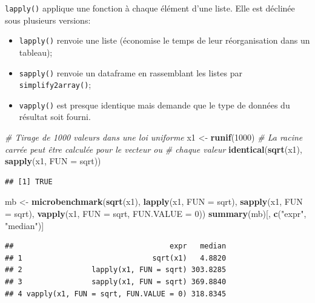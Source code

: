 \documentclass[
  12pt,
  french,
  a4paper,
  extrafontsizes,onecolumn,openright
  ]{memoir}
\newenvironment{Shaded}{\begin{snugshade}}{\end{snugshade}}
\newcommand{\CommentTok}[1]{\textcolor[rgb]{0.56,0.35,0.01}{\textit{#1}}}
\newcommand{\DataTypeTok}[1]{\textcolor[rgb]{0.13,0.29,0.53}{#1}}
\newcommand{\DecValTok}[1]{\textcolor[rgb]{0.00,0.00,0.81}{#1}}
\newcommand{\KeywordTok}[1]{\textcolor[rgb]{0.13,0.29,0.53}{\textbf{#1}}}
\newcommand{\NormalTok}[1]{#1}
\newcommand{\StringTok}[1]{\textcolor[rgb]{0.31,0.60,0.02}{#1}}
\providecommand{\tightlist}{%
  \setlength{\itemsep}{0pt}\setlength{\parskip}{0pt}}
\begin{document}
\texttt{lapply()} applique une fonction à chaque élément d'une liste.
Elle est déclinée sous plusieurs versions:

\begin{itemize}
\tightlist
\item
  \texttt{lapply()} renvoie une liste (économise le temps de leur réorganisation dans un tableau);
\item
  \texttt{sapply()} renvoie un dataframe en rassemblant les listes par \texttt{simplify2array()};
\item
  \texttt{vapply()} est presque identique mais demande que le type de données du résultat soit fourni.
\end{itemize}

\scriptsize

\begin{Shaded}
\begin{Highlighting}[]
\CommentTok{# Tirage de 1000 valeurs dans une loi uniforme}
\NormalTok{x1 <-}\StringTok{ }\KeywordTok{runif}\NormalTok{(}\DecValTok{1000}\NormalTok{)}
\CommentTok{# La racine carrée peut être calculée pour le vecteur ou}
\CommentTok{# chaque valeur}
\KeywordTok{identical}\NormalTok{(}\KeywordTok{sqrt}\NormalTok{(x1), }\KeywordTok{sapply}\NormalTok{(x1, }\DataTypeTok{FUN =}\NormalTok{ sqrt))}
\end{Highlighting}
\end{Shaded}

\begin{verbatim}
## [1] TRUE
\end{verbatim}

\begin{Shaded}
\begin{Highlighting}[]
\NormalTok{mb <-}\StringTok{ }\KeywordTok{microbenchmark}\NormalTok{(}\KeywordTok{sqrt}\NormalTok{(x1), }\KeywordTok{lapply}\NormalTok{(x1, }\DataTypeTok{FUN =}\NormalTok{ sqrt), }\KeywordTok{sapply}\NormalTok{(x1, }
    \DataTypeTok{FUN =}\NormalTok{ sqrt), }\KeywordTok{vapply}\NormalTok{(x1, }\DataTypeTok{FUN =}\NormalTok{ sqrt, }\DataTypeTok{FUN.VALUE =} \DecValTok{0}\NormalTok{))}
\KeywordTok{summary}\NormalTok{(mb)[, }\KeywordTok{c}\NormalTok{(}\StringTok{"expr"}\NormalTok{, }\StringTok{"median"}\NormalTok{)]}
\end{Highlighting}
\end{Shaded}

\begin{verbatim}
##                                    expr   median
## 1                              sqrt(x1)   4.8820
## 2                lapply(x1, FUN = sqrt) 303.8285
## 3                sapply(x1, FUN = sqrt) 369.8840
## 4 vapply(x1, FUN = sqrt, FUN.VALUE = 0) 318.8345
\end{verbatim}
\end{document}
